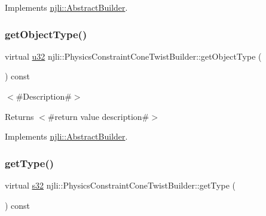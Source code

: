 Implements \mbox{\hyperlink{classnjli_1_1_abstract_builder_a902f73ea78031b06aca183a417f3413b}{njli\+::\+Abstract\+Builder}}.

\mbox{\label{classnjli_1_1_physics_constraint_cone_twist_builder_ace204bc15a20ca9ecb152dcf194b5f18}} 
\subsubsection{\texorpdfstring{get\+Object\+Type()}{getObjectType()}}
{\footnotesize\ttfamily virtual \mbox{\hyperlink{_util_8h_a10e94b422ef0c20dcdec20d31a1f5049}{u32}} njli\+::\+Physics\+Constraint\+Cone\+Twist\+Builder\+::get\+Object\+Type (\begin{DoxyParamCaption}{ }\end{DoxyParamCaption}) const\hspace{0.3cm}{\ttfamily [virtual]}}

$<$\#\+Description\#$>$

\begin{DoxyReturn}{Returns}
$<$\#return value description\#$>$ 
\end{DoxyReturn}


Implements \mbox{\hyperlink{classnjli_1_1_abstract_builder_a0f2d344fcf697b167f4f2b1122b5fb33}{njli\+::\+Abstract\+Builder}}.

\mbox{\label{classnjli_1_1_physics_constraint_cone_twist_builder_a2f461980dcdccd82fb290baa23055eea}} 
\subsubsection{\texorpdfstring{get\+Type()}{getType()}}
{\footnotesize\ttfamily virtual \mbox{\hyperlink{_util_8h_aa62c75d314a0d1f37f79c4b73b2292e2}{s32}} njli\+::\+Physics\+Constraint\+Cone\+Twist\+Builder\+::get\+Type (\begin{DoxyParamCaption}{ }\end{DoxyParamCaption}) const\hspace{0.3cm}{\ttfamily [virtual]}}

